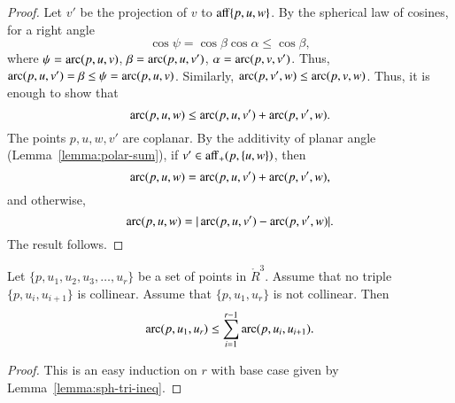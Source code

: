 \begin{proof} Let $v'$ be the projection of $v$ to
${\operatorname{aff}}\{p,u,w\}$.  
By the spherical law of cosines, for a right angle
   $$
   \cos\psi = \cos\beta\cos\alpha \le \cos\beta,
   $$
where $\psi = \operatorname{arc}(p,u,v)$, $\beta = \operatorname{arc}(p,u,v')$, $\alpha=\operatorname{arc}(p,v,v')$.
Thus, $\operatorname{arc}(p,u,v')=\beta\le \psi=\operatorname{arc}(p,u,v)$.
Similarly, $\operatorname{arc}(p,v',w) \le \operatorname{arc}(p,v,w)$.
Thus, it is enough to show that 
  $$
  \operatorname{arc}(p,u,w) \le \operatorname{arc}(p,u,v') + \operatorname{arc}(p,v',w).
  $$
The points $p,u,w,v'$ are coplanar.
By the additivity of planar angle (Lemma~\ref{lemma:polar-sum}), if 
$v'\in {\operatorname{aff}}_+(p,\{u,w\})$, then
   $$
   \operatorname{arc}(p,u,w) = \operatorname{arc}(p,u,v') + \operatorname{arc}(p,v',w),   
   $$
and otherwise,
   $$
   \operatorname{arc}(p,u,w) = |\operatorname{arc}(p,u,v') - \operatorname{arc}(p,v',w)|.
   $$
The result follows.
\end{proof}

\begin{lemma}\label{lemma:sph-tri-multi}
Let $\{p,u_1,u_2,u_3,\ldots,u_r\}$ be a set of points in $\ring{R}^3$.
Assume that no triple $\{p,u_i,u_{i+1}\}$ is collinear.  Assume
that $\{p,u_1,u_r\}$ is not collinear.  Then
$$
  \operatorname{arc}(p,u_1,u_r) \le \sum_{i=1}^{r-1} \operatorname{arc}(p,u_i,u_{i+1}).
$$
\end{lemma}

\begin{proof} This is an easy induction on $r$ with base
case given by Lemma~\ref{lemma:sph-tri-ineq}.
\end{proof}
